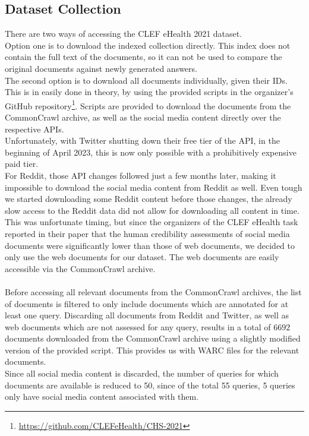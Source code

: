 \subsection{Dataset Collection}
There are two ways of accessing the CLEF eHealth 2021 dataset.
\\
Option one is to download the indexed collection directly.
This index does not contain the full text of the documents, so it can not be used to compare the original documents against newly generated answers.
\\
The second option is to download all documents individually, given their IDs.
This is in easily done in theory, by using the provided scripts in the organizer's GitHub repository\footnote{\url{https://github.com/CLEFeHealth/CHS-2021}}.
Scripts are provided to download the documents from the CommonCrawl archive, as well as the social media content directly over the respective APIs.
\\
Unfortunately, with Twitter shutting down their free tier of the API, in the beginning of April 2023, this is now only possible with a prohibitively expensive paid tier.
\\
For Reddit, those API changes followed just a few months later, making it impossible to download the social media content from Reddit as well.
Even tough we started downloading some Reddit content before those changes, the already slow access to the Reddit data did not allow for downloading all content in time.
\\
This was unfortunate timing, but since the organizers of the CLEF eHealth task reported in their paper that the human credibility assessments of social media documents were significantly lower than those of web documents, we decided to only use the web documents for our dataset.
The web documents are easily accessible via the CommonCrawl archive.
\\
\\
Before accessing all relevant documents from the CommonCrawl archives, the list of documents is filtered to only include documents which are annotated for at least one query.
Discarding all documents from Reddit and Twitter, as well as web documents which are not assessed for any query, results in a total of $6692$ documents downloaded from the CommonCrawl archive using a slightly modified version of the provided script.
This provides us with WARC files for the relevant documents.
\\
Since all social media content is discarded, the number of queries for which documents are available is reduced to 50, since of the total 55 queries, 5 queries only have social media content associated with them.

